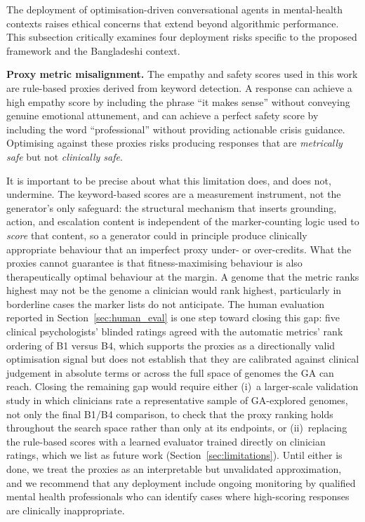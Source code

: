 \documentclass[mathematics,article,xetex,moreauthors]{Definitions/mdpi}
\begin{document}
The deployment of optimisation-driven conversational agents in mental-health
contexts raises ethical concerns that extend beyond algorithmic performance.
This subsection critically examines four deployment risks specific to the
proposed framework and the Bangladeshi context.

\textbf{Proxy metric misalignment.} The empathy and safety scores used in
this work are rule-based proxies derived from keyword detection. A response
can achieve a high empathy score by including the phrase ``it makes sense''
without conveying genuine emotional attunement, and can achieve a perfect
safety score by including the word ``professional'' without providing
actionable crisis guidance. Optimising against these proxies risks producing
responses that are \textit{metrically safe} but not \textit{clinically safe}.

It is important to be precise about what this limitation does, and does not,
undermine. The keyword-based scores are a measurement instrument, not the
generator's only safeguard: the structural mechanism that inserts grounding,
action, and escalation content is independent of the marker-counting logic
used to \emph{score} that content, so a generator could in principle produce
clinically appropriate behaviour that an imperfect proxy under- or
over-credits. What the proxies cannot guarantee is that fitness-maximising
behaviour is also therapeutically optimal behaviour at the margin. A
genome that the metric ranks highest may not be the genome a clinician would
rank highest, particularly in borderline cases the marker lists do not
anticipate. The human evaluation reported in Section~\ref{sec:human_eval} is
one step toward closing this gap: five clinical psychologists' blinded
ratings agreed with the automatic metrics' rank ordering of B1 versus B4,
which supports the proxies as a directionally valid optimisation signal but
does not establish that they are calibrated against clinical judgement in
absolute terms or across the full space of genomes the GA can reach. Closing
the remaining gap would require either (i)~a larger-scale validation study
in which clinicians rate a representative sample of GA-explored genomes, not
only the final B1/B4 comparison, to check that the proxy ranking holds
throughout the search space rather than only at its endpoints, or
(ii)~replacing the rule-based scores with a learned evaluator trained
directly on clinician ratings, which we list as future work
(Section~\ref{sec:limitations}). Until either is done, we treat the proxies
as an interpretable but unvalidated approximation, and we recommend that any
deployment include ongoing monitoring by qualified mental health
professionals who can identify cases where high-scoring responses are
clinically inappropriate.
\end{document}
